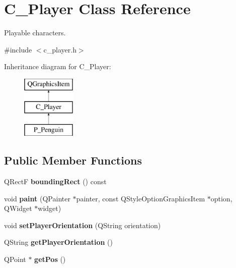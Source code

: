 \hypertarget{class_c___player}{}\section{C\+\_\+\+Player Class Reference}
\label{class_c___player}


Playable characters.  




{\ttfamily \#include $<$c\+\_\+player.\+h$>$}

Inheritance diagram for C\+\_\+\+Player\+:\begin{figure}[H]
\begin{center}
\leavevmode
\includegraphics[height=3.000000cm]{class_c___player}
\end{center}
\end{figure}
\subsection*{Public Member Functions}
\begin{DoxyCompactItemize}
\item 
\hypertarget{class_c___player_a5bd08f64dda12fb5199b0d6bbadbe0f3}{}Q\+Rect\+F {\bfseries bounding\+Rect} () const \label{class_c___player_a5bd08f64dda12fb5199b0d6bbadbe0f3}

\item 
\hypertarget{class_c___player_a586c7ebe2d1bf15a9ed4baef76bc4fc7}{}void {\bfseries paint} (Q\+Painter $\ast$painter, const Q\+Style\+Option\+Graphics\+Item $\ast$option, Q\+Widget $\ast$widget)\label{class_c___player_a586c7ebe2d1bf15a9ed4baef76bc4fc7}

\item 
\hypertarget{class_c___player_a4a4d9302d86bb185a9b850bcf53e0b52}{}void {\bfseries set\+Player\+Orientation} (Q\+String orientation)\label{class_c___player_a4a4d9302d86bb185a9b850bcf53e0b52}

\item 
\hypertarget{class_c___player_a3af2c62ed7e7809e72d8154a8cc4ab43}{}Q\+String {\bfseries get\+Player\+Orientation} ()\label{class_c___player_a3af2c62ed7e7809e72d8154a8cc4ab43}

\item 
\hypertarget{class_c___player_a1791dc6a4a378bea4f22766994b659ca}{}Q\+Point $\ast$ {\bfseries get\+Pos} ()\label{class_c___player_a1791dc6a4a378bea4f22766994b659ca}

\end{DoxyCompactItemize}
